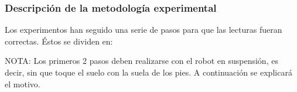 \subsubsection{Descripción de la metodología experimental}

Los experimentos han seguido una serie de pasos para que las lecturas fueran correctas. Éstos se dividen en:

NOTA: Los primeros 2 pasos deben realizarse con el robot en suspensión, es decir, sin que toque el suelo con la suela de los pies. A continuación se explicará el motivo.

